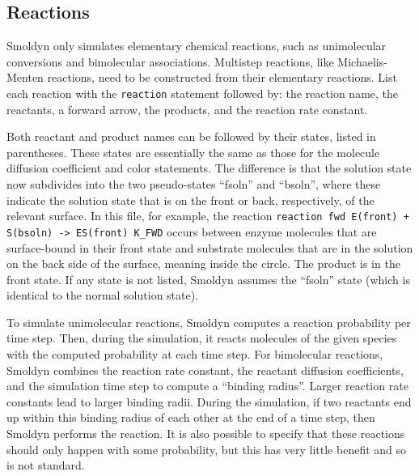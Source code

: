 \documentclass {scrbook}
\newcommand {\ttt} {\texttt}
\begin{document}
\subsection*{Reactions}

Smoldyn only simulates elementary chemical reactions, such as unimolecular conversions and bimolecular associations. Multistep reactions, like Michaelis-Menten reactions, need to be constructed from their elementary reactions. List each reaction with the  \ttt{reaction} statement followed by: the reaction name, the reactants, a forward arrow, the products, and the reaction rate constant.

Both reactant and product names can be followed by their states, listed in parentheses. These states are essentially the same as those for the molecule diffusion coefficient and color statements. The difference is that the solution state now subdivides into the two pseudo-states ``fsoln'' and ``bsoln'', where these indicate the solution state that is on the front or back, respectively, of the relevant surface. In this file, for example, the reaction  \ttt{reaction fwd E(front) + S(bsoln) -> ES(front) K\_FWD} occurs between enzyme molecules that are surface-bound in their front state and substrate molecules that are in the solution on the back side of the surface, meaning inside the circle. The product is in the front state. If any state is not listed, Smoldyn assumes the ``fsoln'' state (which is identical to the normal solution state).

To simulate unimolecular reactions, Smoldyn computes a reaction probability per time step. Then, during the simulation, it reacts molecules of the given species with the computed probability at each time step. For bimolecular reactions, Smoldyn combines the reaction rate constant, the reactant diffusion coefficients, and the simulation time step to compute a ``binding radius''. Larger reaction rate constants lead to larger binding radii. During the simulation, if two reactants end up within this binding radius of each other at the end of a time step, then Smoldyn performs the reaction. It is also possible to specify that these reactions should only happen with some probability, but this has very little benefit and so is not standard.
\end{document}
